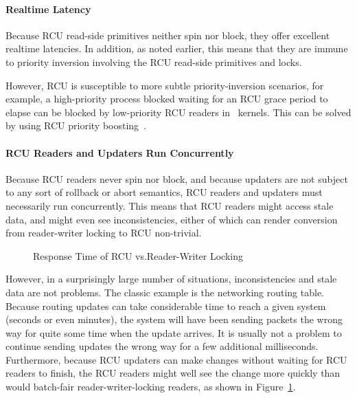 \QuickQuizEnd

\paragraph{Realtime Latency}

Because RCU read-side primitives neither spin nor block, they offer
excellent realtime latencies.
In addition, as noted earlier, this means that they are
immune to priority inversion
involving the RCU read-side primitives and locks.

However, RCU is susceptible to more subtle priority-inversion scenarios,
for example, a high-priority process blocked waiting for an RCU
grace period to elapse can be blocked by low-priority RCU readers
in \rt\ kernels.
This can be solved by using RCU priority
boosting~\cite{PaulEMcKenney2007BoostRCU,DinakarGuniguntala2008IBMSysJ}.

\paragraph{RCU Readers and Updaters Run Concurrently}

Because RCU readers never spin nor block, and because updaters are not
subject to any sort of rollback or abort semantics, RCU readers and
updaters must necessarily run concurrently.
This means that RCU readers might access stale data, and might even
see inconsistencies, either of which can render conversion from reader-writer
locking to RCU non-trivial.

\begin{figure}[tb]
\centering
{}
\caption{Response Time of RCU vs.\@ Reader-Writer Locking}
\label{fig:defer:Response Time of RCU vs. Reader-Writer Locking}
\end{figure}

However, in a surprisingly large number of situations, inconsistencies and
stale data are not problems.
The classic example is the networking routing table.
Because routing updates can take considerable time to reach a given
system (seconds or even minutes), the system will have been sending
packets the wrong way for quite some time when the update arrives.
It is usually not a problem to continue sending updates the wrong
way for a few additional milliseconds.
Furthermore, because RCU updaters can make changes without waiting for
RCU readers to finish,
the RCU readers might well see the change more quickly than would
batch-fair
reader-writer-locking readers, as shown in
Figure~\ref{fig:defer:Response Time of RCU vs. Reader-Writer Locking}.

